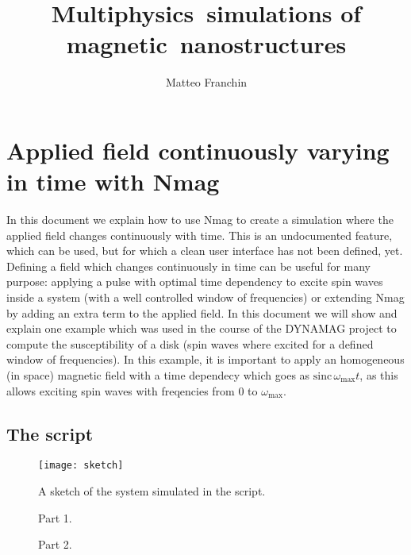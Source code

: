 \documentclass[11pt,oneside,openany]{article}
\author{Matteo Franchin}
\title{Multiphysics~simulations of magnetic~nanostructures}
\begin{document}
\titlepage

\section{Applied field continuously varying in time with Nmag}
In this document we explain how to use Nmag to create a simulation where
the applied field changes continuously with time.
This is an undocumented feature, which can be used, but for which a clean
user interface has not been defined, yet.
Defining a field which changes continuously in time can be useful for many
purpose: applying a pulse with optimal time dependency to excite spin waves
inside a system (with a well controlled window of frequencies) or extending
Nmag by adding an extra term to the applied field.
In this document we will show and explain one example which was used
in the course of the DYNAMAG project to compute the susceptibility
of a disk (spin waves where excited for a defined window of frequencies).
In this example, it is important to apply an homogeneous (in space) magnetic
field with a time dependecy which goes as
$\mathrm{sinc} \, \omega_{\mathrm{max}} t$,
as this allows exciting spin waves with freqencies from 0 to
$\omega_{\mathrm{max}}$.

\subsection{The script}
\begin{figure}[t]
\begin{center}
\texttt{[image: sketch]}
\caption[Sketch]{A sketch of the system simulated in the script.}
\label{fig_es_types}
\end{center}
\end{figure}


\begin{figure}[!p]

\caption{Part 1.}
\end{figure}

\begin{figure}[!p]

\caption{Part 2.}
\end{figure}
\end{document}
